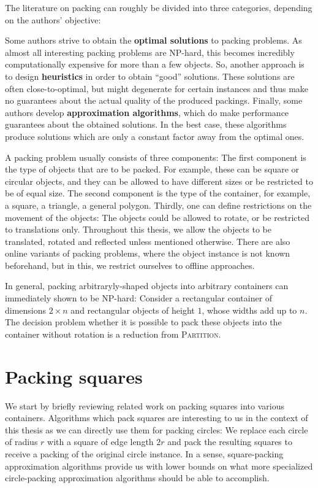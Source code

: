 \documentclass[a4paper,style=print,oneside,bibliography=totoc,nexus,lnum,extramargin]{tubsbook}
\begin{document}
The literature on packing can roughly be divided into three categories, depending on the authors' objective:

Some authors strive to obtain the \textbf{optimal solutions} to packing problems. As almost all interesting packing problems are NP-hard, this becomes incredibly computationally expensive for more than a few objects.
So, another approach is to design \textbf{heuristics} in order to obtain “good” solutions. These solutions are often close-to-optimal, but might degenerate for certain instances and thus make no guarantees about the actual quality of the produced packings.
Finally, some authors develop \textbf{approximation algorithms}, which do make performance guarantees about the obtained solutions. In the best case, these algorithms produce solutions which are only a constant factor away from the optimal ones.

A packing problem usually consists of three components: The first component is the type of objects that are to be packed. For example, these can be square or circular objects, and they can be allowed to have different sizes or be restricted to be of equal size. The second component is the type of the container, for example, a square, a triangle, a general polygon. Thirdly, one can define restrictions on the movement of the objects: The objects could be allowed to rotate, or be restricted to translations only. Throughout this thesis, we allow the objects to be translated, rotated and reflected unless mentioned otherwise. There are also online variants of packing problems, where the object instance is not known beforehand, but in this, we restrict ourselves to offline approaches.

In general, packing arbitraryly-shaped objects into arbitrary containers can immediately shown to be NP-hard: Consider a rectangular container of dimensions $2 \times n$ and rectangular objects of height $1$, whose widths add up to $n$. The decision problem whether it is possible to pack these objects into the container without rotation is a reduction from \textsc{Partition}.

\section{Packing squares}\label{sec:related-squares}

We start by briefly reviewing related work on packing squares into various containers.
Algorithms which pack squares are interesting to us in the context of this thesis as we can directly use them for packing circles: We replace each circle of radius $r$ with a square of edge length $2r$ and pack the resulting squares to receive a packing of the original circle instance. In a sense, square-packing approximation algorithms provide us with lower bounds on what more specialized circle-packing approximation algorithms should be able to accomplish.
\end{document}

